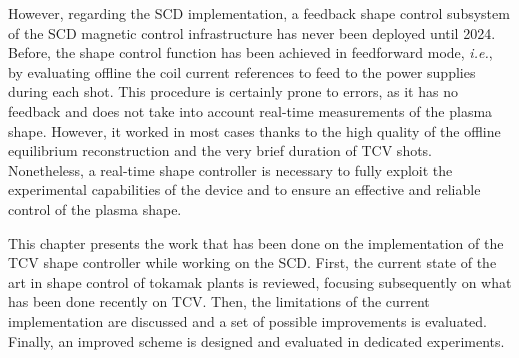 However, regarding the SCD implementation, a feedback shape control subsystem of the SCD magnetic control infrastructure has never been deployed until 2024. Before, the shape control function has been achieved in feedforward mode, \emph{i.e.}, by evaluating offline the coil current references to feed to the power supplies during each shot. This procedure is certainly prone to errors, as it has no feedback and does not take into account real-time measurements of the plasma shape. However, it worked in most cases thanks to the high quality of the offline equilibrium reconstruction and the very brief duration of TCV shots. Nonetheless, a real-time shape controller is necessary to fully exploit the experimental capabilities of the device and to ensure an effective and reliable control of the plasma shape.

This chapter presents the work that has been done on the implementation of the TCV shape controller while working on the SCD. First, the current state of the art in shape control of tokamak plants is reviewed, focusing subsequently on what has been done recently on TCV. Then, the limitations of the current implementation are discussed and a set of possible improvements is evaluated. Finally, an improved scheme is designed and evaluated in dedicated experiments.









